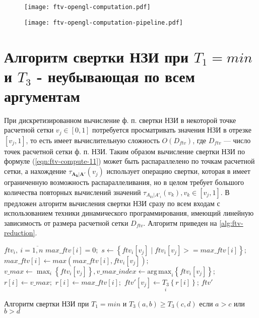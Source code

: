 \begin{figure}[hbt]
	\centering
   	\texttt{[image: ftv-opengl-computation.pdf]}
	\label{ftv-opengl-computation}
\end{figure}

\begin{figure}[hbt]
	\centering
   	\texttt{[image: ftv-opengl-computation-pipeline.pdf]}
	\label{ftv-opengl-computation-pipeline}
\end{figure}

\section{Алгоритм свертки НЗИ при $T_1=min$ и $T_3$ - неубывающая по всем аргументам}\label{sec:ch3/sect2}

При дискретизированном вычисление ф. п. свертки НЗИ в некоторой точке расчетной сетки $v_j\in [0,1]$ потребуется просматривать значения НЗИ в отрезке $[v_j, 1]$, то есть имеет вычислительную сложность $O(D_{ftv})$, где $D_{ftv}$ --- число точек расчетной сетки ф. п. НЗИ. Таким образом вычисление свертки НЗИ по формуле (\ref{eqn:ftv-compute-11}) может быть распараллелено по точкам расчетной сетки, а нахождение $\tau_{\mathbf{A_k}|\mathbf{A'}}(v_j)$ использует операцию свертки, которая в имеет ограниченную возможность распараллеливания, но в целом требует большого количества повторных вычислений значений $\tau_{A_{ki}|A'_i}(v_k), v_k\in [v_j, 1]$. В \cite{Karatach2024} предложен алгоритм вычисления свертки НЗИ сразу по всем входам с использованием техники динамического программирования, имеющий линейную зависимость от размера расчетной сетки $D_{ftv}$. Алгоритм приведен на \cref{alg:ftv-reduction}.

\begin{algorithm}
\begin{algorithmic}
\Require $ftv_i,\ i=\overline{1,n}$
\State $max\_ftv[i] = 0;$
\State $s \gets \left\{ftv_i[v_j] \mid ftv_i[v_j] >= max\_ftv[i]\right\};$
\State $max\_ftv[i] \gets max(max\_ftv[i], ftv_i[v_j]);$
\State $v\_max \gets \max_{i}\left\{ftv_i[v_j]\right\}, v\_max\_index \gets \mathrm{arg\,max}_i\left\{ftv_i[v_j]\right\};$
\State $r[i] \gets v\_max;$
\Else
\State $r[i] \gets max\_ftv[i];$
\EndIf
\State $ftv'[v_j] \gets \underset{i}{T_3}\left\{r[i]\right\}$;
\EndFor
\State \Return $ftv'$
\end{algorithmic}
\caption{Алгоритм свертки НЗИ при $T_1=min$ и $T_3(a, b) \ge T_3(c, d)$ если $a > c$ или $b > d$}
\label{alg:ftv-reduction}
\end{algorithm}

